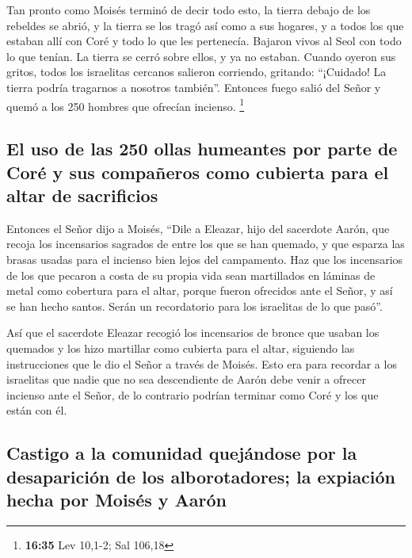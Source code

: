  Tan pronto como Moisés terminó de decir todo esto, la
tierra debajo de los rebeldes se abrió,  y la tierra se
los tragó así como a sus hogares, y a todos los que estaban allí con
Coré y todo lo que les pertenecía.  Bajaron vivos al Seol
con todo lo que tenían. La tierra se cerró sobre ellos, y ya no estaban.
 Cuando oyeron sus gritos, todos los israelitas cercanos
salieron corriendo, gritando: ``¡Cuidado! La tierra podría tragarnos a
nosotros también''.  Entonces fuego salió del Señor y
quemó a los 250 hombres que ofrecían incienso. \footnote{\textbf{16:35}
  Lev 10,1-2; Sal 106,18}

\hypertarget{el-uso-de-las-250-ollas-humeantes-por-parte-de-coruxe9-y-sus-compauxf1eros-como-cubierta-para-el-altar-de-sacrificios}{%
\subsection{El uso de las 250 ollas humeantes por parte de Coré y sus
compañeros como cubierta para el altar de
sacrificios}\label{el-uso-de-las-250-ollas-humeantes-por-parte-de-coruxe9-y-sus-compauxf1eros-como-cubierta-para-el-altar-de-sacrificios}}

 Entonces el Señor dijo a Moisés,  ``Dile
a Eleazar, hijo del sacerdote Aarón, que recoja los incensarios sagrados
de entre los que se han quemado, y que esparza las brasas usadas para el
incienso bien lejos del campamento.  Haz que los
incensarios de los que pecaron a costa de su propia vida sean
martillados en láminas de metal como cobertura para el altar, porque
fueron ofrecidos ante el Señor, y así se han hecho santos. Serán un
recordatorio para los israelitas de lo que pasó''.

 Así que el sacerdote Eleazar recogió los incensarios de
bronce que usaban los quemados y los hizo martillar como cubierta para
el altar,  siguiendo las instrucciones que le dio el
Señor a través de Moisés. Esto era para recordar a los israelitas que
nadie que no sea descendiente de Aarón debe venir a ofrecer incienso
ante el Señor, de lo contrario podrían terminar como Coré y los que
están con él.

\hypertarget{castigo-a-la-comunidad-quejuxe1ndose-por-la-desapariciuxf3n-de-los-alborotadores-la-expiaciuxf3n-hecha-por-moisuxe9s-y-aaruxf3n}{%
\subsection{Castigo a la comunidad quejándose por la desaparición de los
alborotadores; la expiación hecha por Moisés y
Aarón}\label{castigo-a-la-comunidad-quejuxe1ndose-por-la-desapariciuxf3n-de-los-alborotadores-la-expiaciuxf3n-hecha-por-moisuxe9s-y-aaruxf3n}}

